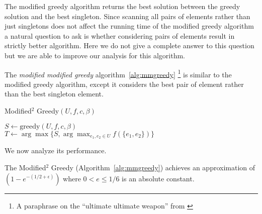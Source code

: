 The modified greedy algorithm returns the best solution between the greedy solution and the best singleton.
Since scanning all pairs of elements rather than just singletons does not affect the running time of the modified greedy algorithm a natural question to ask is whether considering pairs of elements result in strictly better algorithm.
Here we do not give a complete answer to this question but we are able to improve our analysis for this algorithm. 

The \emph{modified modified greedy} algorithm~\ref{alg:mmgreedy} 
\footnote{A paraphrase on the ``ultimate ultimate weapon'' from \cite{ninjago2017}}
is similar to the  modified greedy algorithm, 
except it considers the best pair of element rather than the best singleton element.


\begin{algorithm}[H]
\label{alg:mmgreedy}
\caption{Modified$^2$ Greedy$(U, f, c, \beta)$}

$S \leftarrow \text{greedy}(U, f, c, \beta)$
\\
$T \leftarrow \arg\max\{S, \arg\max_{e_1, e_2 \in U}f(\{e_1, e_2\})\}$
\\
\end{algorithm}

We now analyze its performance.

\begin{theorem}
	\label{theorem:mmgreedy}
	The Modified$^2$ Greedy (Algorithm~\ref{alg:mmgreedy}) achieves an approximation of $(1-e^{-(1/2 + \epsilon)})$ where $0 < e \leq 1/6$ is an absolute constant.
\end{theorem}

